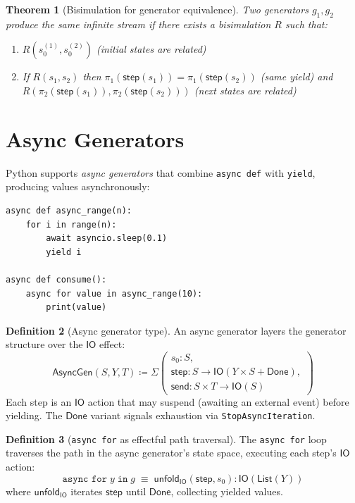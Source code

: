 \documentclass[11pt,a4paper]{report}
\theoremstyle{definition}
\newtheorem{definition}{Definition}[chapter]
\theoremstyle{plain}
\newtheorem{theorem}[definition]{Theorem}
\newcommand{\defeq}{\coloneqq}
\newcommand{\IO}{\mathsf{IO}}
\begin{document}
\begin{theorem}[Bisimulation for generator equivalence]
Two generators $g_1, g_2$ produce the same infinite stream if there exists
a bisimulation $R$ such that:
\begin{enumerate}
  \item $R(s_0^{(1)}, s_0^{(2)})$ (initial states are related)
  \item If $R(s_1, s_2)$ then $\pi_1(\mathsf{step}(s_1)) = \pi_1(\mathsf{step}(s_2))$
    (same yield) and $R(\pi_2(\mathsf{step}(s_1)), \pi_2(\mathsf{step}(s_2)))$
    (next states are related)
\end{enumerate}
\end{theorem}

\section{Async Generators}

Python supports \emph{async generators} that combine \texttt{async def}
with \texttt{yield}, producing values asynchronously:

\begin{lstlisting}[style=python]
async def async_range(n):
    for i in range(n):
        await asyncio.sleep(0.1)
        yield i

async def consume():
    async for value in async_range(10):
        print(value)
\end{lstlisting}

\begin{definition}[Async generator type]
An async generator layers the generator structure over the $\IO$ effect:
\[
  \mathsf{AsyncGen}(S, Y, T) \defeq \Sigma\left(
    \begin{array}{l}
      s_0 : S, \\
      \mathsf{step} : S \to \IO(Y \times S + \mathsf{Done}), \\
      \mathsf{send} : S \times T \to \IO(S)
    \end{array}
  \right)
\]
Each step is an $\IO$ action that may suspend (awaiting an external event)
before yielding.  The $\mathsf{Done}$ variant signals exhaustion via
\texttt{StopAsyncIteration}.
\end{definition}

\begin{definition}[\texttt{async for} as effectful path traversal]
The \texttt{async for} loop traverses the path in the async generator's
state space, executing each step's $\IO$ action:
\[
  \texttt{async for}\;y\;\texttt{in}\;g
  \;\equiv\;
  \mathsf{unfold}_\IO(\mathsf{step}, s_0)
  : \IO(\mathsf{List}(Y))
\]
where $\mathsf{unfold}_\IO$ iterates $\mathsf{step}$ until
$\mathsf{Done}$, collecting yielded values.
\end{definition}
\end{document}
